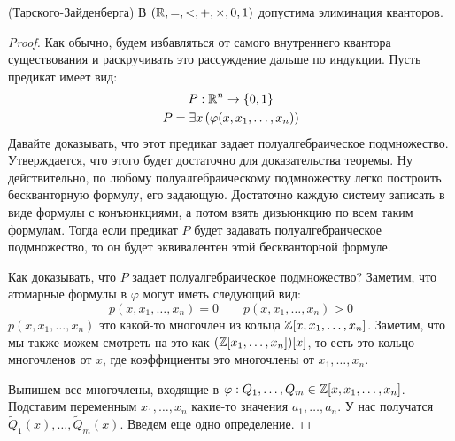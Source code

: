 \begin{theorem} (Тарского-Зайденберга) \quad
    В $(\mathbb{R}, =, <, +, \times, 0, 1)$ допустима элиминация кванторов. 
\end{theorem}
\begin{proof}
    Как обычно, будем избавляться от самого внутреннего квантора существования и раскручивать это рассуждение дальше по индукции. Пусть предикат имеет вид: \begin{gather*}
        P: \mathbb{R}^n \to \{0, 1\} \\
        P = \exists x \, (\varphi(x, x_1, \dots, x_n))
    \end{gather*}
    Давайте доказывать, что этот предикат задает полуалгебраическое подмножество. Утверждается, что этого будет достаточно для доказательства теоремы. Ну действительно, по любому полуалгебраическому подмножеству легко построить бескванторную формулу, его задающую. Достаточно каждую систему записать  в виде формулы с конъюнкциями, а потом взять дизъюнкцию по всем таким формулам. Тогда если предикат $P$ будет задавать полуалгебраическое подмножество, то он будет эквивалентен этой бескванторной формуле.

    Как доказывать, что $P$ задает полуалгебраическое подмножество?
    Заметим, что атомарные формулы в $\varphi$ могут иметь следующий вид: \[ p(x, x_1, \dots, x_n) = 0 \qquad p(x, x_1, \dots, x_n) > 0 \]
    $p(x, x_1, \dots, x_n)$ это какой-то многочлен из кольца $\mathbb{Z}[x, x_1, \dots, x_n]$. Заметим, что мы также можем смотреть на это как $(\mathbb{Z}[x_1, \dots, x_n])[x]$, то есть это кольцо многочленов от $x$, где коэффициенты это многочлены от $x_1, \dots, x_n$.

    Выпишем все многочлены, входящие в $\varphi: Q_1, \dots, Q_m \in \mathbb{Z}[x, x_1, \dots, x_n]$. Подставим переменным $x_1, \dots, x_n$ какие-то значения $a_1, \dots, a_n$. У нас получатся $\tilde{Q}_1(x), \dots, \tilde{Q}_m(x)$. Введем еще одно определение.


\end{proof}
